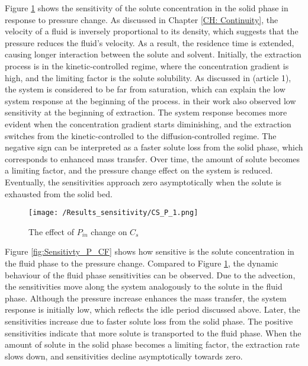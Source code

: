 \documentclass[../Article_Sensitivity_Analsysis.tex]{subfiles}
\begin{document}
	Figure \ref{fig:Sensitivty_P_CS} shows the sensitivity of the solute concentration in the solid phase in response to pressure change. As discussed in Chapter \ref{CH: Continuity}, the velocity of a fluid is inversely proportional to its density, which suggests that the pressure reduces the fluid's velocity. As a result, the residence time is extended, causing longer interaction between the solute and solvent. Initially, the extraction process is in the kinetic-controlled regime, where the concentration gradient is high, and the limiting factor is the solute solubility. As discussed in ({\color{red}article 1}), the system is considered to be far from saturation, which can explain the low system response at the beginning of the process. \citet{Fiori_2007} in their work also observed low sensitivity at the beginning of extraction. The system response becomes more evident when the concentration gradient starts diminishing, and the extraction switches from the kinetic-controlled to the diffusion-controlled regime. The negative sign can be interpreted as a faster solute loss from the solid phase, which corresponds to enhanced mass transfer. Over time, the amount of solute becomes a limiting factor, and the pressure change effect on the system is reduced. Eventually, the sensitivities approach zero asymptotically when the solute is exhausted from the solid bed.

	\begin{figure}[!ht]
		\centering
		\texttt{[image: /Results\_sensitivity/CS\_P\_1.png]}
		\caption{The effect of $P_{in}$ change on $C_s$}
		\label{fig:Sensitivty_P_CS}
	\end{figure}
	
	Figure \ref{fig:Sensitivty_P_CF} shows how sensitive is the solute concentration in the fluid phase to the pressure change. Compared to Figure \ref{fig:Sensitivty_P_CS}, the dynamic behaviour of the fluid phase sensitivities can be observed. Due to the advection, the sensitivities move along the system analogously to the solute in the fluid phase.	Although the pressure increase enhances the mass transfer, the system response is initially low, which reflects the idle period discussed above. Later, the sensitivities increase due to faster solute loss from the solid phase. The positive sensitivities indicate that more solute is transported to the fluid phase. When the amount of solute in the solid phase becomes a limiting factor, the extraction rate slows down, and sensitivities decline asymptotically towards zero.
	
\end{document}
